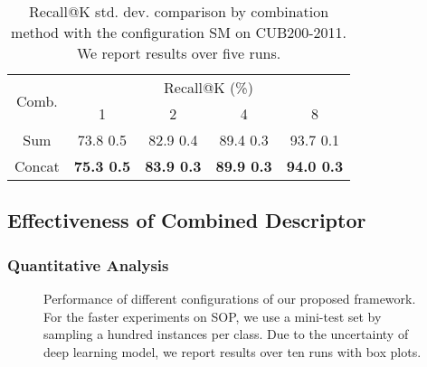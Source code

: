 \documentclass[10pt,twocolumn,letterpaper]{article}
\begin{document}
\begin{CJK}{UTF8}{mj}
\begin{table}[t!]
\begin{center}
\begin{adjustbox}{width=0.96\columnwidth,center}
\begin{tabular}{c|cccc}
\hline
\multirow{2}{*}{Comb.} & \multicolumn{4}{c}{Recall@K (\%)} \\ \cline{2-5} 
                        & 1                     & 2                     & 4                     & 8                     \\
                       \hline\hline
Sum                     & 73.8  0.5	        & 82.9  0.4	        & 89.4  0.3	        & 93.7  0.1            \\ 
Concat	                & \textbf{75.3  0.5}	& \textbf{83.9  0.3}	& \textbf{89.9  0.3}	& \textbf{94.0  0.3}   \\ \hline
\end{tabular}
\end{adjustbox}
\end{center}
\caption{Recall@K  std. dev. comparison by combination method with the configuration SM on CUB200-2011.
We report results over five runs.}
\label{table:combination}
\vspace{-0.3em}
\end{table}

\subsection{Effectiveness of Combined Descriptor} \label{sec:effectiveness_of_combined_descriptor}
\subsubsection{Quantitative Analysis} \label{sec:quantitative_analysis}

\begin{figure*}[h!t!] \vspace{-2.2em}
\centering
{}\hfil
{}
\vspace{-1em}
\hfil
{}
\vspace{1em}
\caption{Performance of different configurations of our proposed framework.
For the faster experiments on SOP, we use a mini-test set by sampling a hundred instances per class.
Due to the uncertainty of deep learning model, we report results over ten runs with box plots.
}
\label{fig:configuration}
\vspace{-0.3em}
\end{figure*}


\end{CJK}
\end{document}
